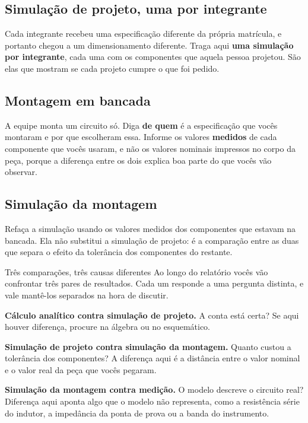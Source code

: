 \documentclass[11pt,a4paper]{article}
\begin{document}
\subsection{Simulação de projeto, uma por integrante}

Cada integrante recebeu uma especificação diferente da própria matrícula, e portanto chegou
a um dimensionamento diferente. Traga aqui \textbf{uma simulação por integrante}, cada uma
com os componentes que aquela pessoa projetou. São elas que mostram se cada projeto cumpre
o que foi pedido.

\subsection{Montagem em bancada}

A equipe monta um circuito só. Diga \textbf{de quem} é a especificação que vocês montaram e
por que escolheram essa. Informe os valores \textbf{medidos} de cada componente que vocês
usaram, e não os valores nominais impressos no corpo da peça, porque a diferença entre os
dois explica boa parte do que vocês vão observar.

\subsection{Simulação da montagem}

Refaça a simulação usando os valores medidos dos componentes que estavam na bancada. Ela
não substitui a simulação de projeto: é a comparação entre as duas que separa o efeito da
tolerância dos componentes do restante.

\begin{nota}{Três comparações, três causas diferentes}
Ao longo do relatório vocês vão confrontar três pares de resultados. Cada um responde a uma
pergunta distinta, e vale mantê-los separados na hora de discutir.

\smallskip
\textbf{Cálculo analítico contra simulação de projeto.} A conta está certa? Se aqui houver
diferença, procure na álgebra ou no esquemático.

\smallskip
\textbf{Simulação de projeto contra simulação da montagem.} Quanto custou a tolerância dos
componentes? A diferença aqui é a distância entre o valor nominal e o valor real da peça
que vocês pegaram.

\smallskip
\textbf{Simulação da montagem contra medição.} O modelo descreve o circuito real? Diferença
aqui aponta algo que o modelo não representa, como a resistência série do indutor, a
impedância da ponta de prova ou a banda do instrumento.
\end{nota}
\end{document}
